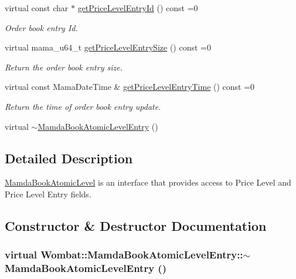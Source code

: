 \begin{CompactItemize}
virtual const char $\ast$ \hyperlink{classWombat_1_1MamdaBookAtomicLevelEntry_38c3e2bffcc1bce4ff9453e278141d13}{get\-Price\-Level\-Entry\-Id} () const =0
\begin{CompactList}\small\item\em Order book entry Id. \item\end{CompactList}\item 
virtual mama\_\-u64\_\-t \hyperlink{classWombat_1_1MamdaBookAtomicLevelEntry_1c086ffcdec385808fc04a111eddf1d0}{get\-Price\-Level\-Entry\-Size} () const =0
\begin{CompactList}\small\item\em Return the order book entry size. \item\end{CompactList}\item 
virtual const Mama\-Date\-Time \& \hyperlink{classWombat_1_1MamdaBookAtomicLevelEntry_dec1931e3377c2f62bfee4900e51ce8a}{get\-Price\-Level\-Entry\-Time} () const =0
\begin{CompactList}\small\item\em Return the time of order book entry update. \item\end{CompactList}\item 
virtual \hyperlink{classWombat_1_1MamdaBookAtomicLevelEntry_de51e416cd8be6b49497cd367e9321ca}{$\sim$Mamda\-Book\-Atomic\-Level\-Entry} ()
\end{CompactItemize}


\subsection{Detailed Description}
\hyperlink{classWombat_1_1MamdaBookAtomicLevel}{Mamda\-Book\-Atomic\-Level} is an interface that provides access to Price Level and Price Level Entry fields. 



\subsection{Constructor \& Destructor Documentation}
\hypertarget{classWombat_1_1MamdaBookAtomicLevelEntry_de51e416cd8be6b49497cd367e9321ca}{
\subsubsection[$\sim$MamdaBookAtomicLevelEntry]{\setlength{\rightskip}{0pt plus 5cm}virtual Wombat::Mamda\-Book\-Atomic\-Level\-Entry::$\sim$Mamda\-Book\-Atomic\-Level\-Entry ()}}
\label{classWombat_1_1MamdaBookAtomicLevelEntry_de51e416cd8be6b49497cd367e9321ca}




